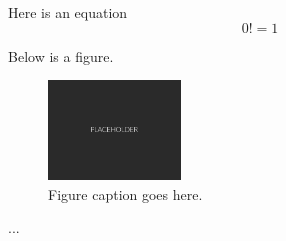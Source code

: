\documentclass[11pt]{article}
\begin{document}
\frontmatter



Here is an equation
%
\begin{equation}
0! = 1
\end{equation}




Below is a figure.

\begin{figure}[H]
\hypertarget{fig1}{}
\centering
\includegraphics[width=100pt]{Figures/Placeholder.png}
\caption{Figure caption goes here.}
\end{figure}




...


%
\end{document}
